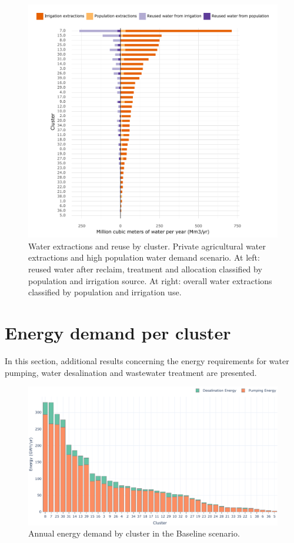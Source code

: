 \documentclass[12pt]{iopart}
\begin{document}
\begin{figure}[!h]
	\centering
	\includegraphics[width=\textwidth]{Priv_agri_water_High_pop_water}
	\caption{Water extractions and reuse by cluster. Private agricultural water extractions and high population water demand scenario. At left: reused water after reclaim, treatment and allocation classified by population and irrigation source. At right: overall water extractions classified by population and irrigation use.}
	\label{fig:PrivAgHighPopWater}
\end{figure} 
\newpage

\section{Energy demand per cluster}
In this section, additional results concerning the energy requirements for water pumping, water desalination and wastewater treatment are presented.
\begin{figure}[!h]
	\centering
	\includegraphics[width=\textwidth]{BaselineEnergyPerCluster}
	\caption{Annual energy demand by cluster in the Baseline scenario.}
	\label{fig:BaselineEnergyPerCluster}
\end{figure} 
\end{document}
